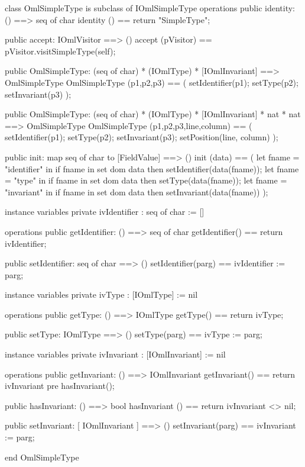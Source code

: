 \begin{vdm_al}
class OmlSimpleType is subclass of IOmlSimpleType
operations
  public identity: () ==> seq of char
  identity () == return "SimpleType";

  public accept: IOmlVisitor ==> ()
  accept (pVisitor) == pVisitor.visitSimpleType(self);

  public OmlSimpleType:
    (seq of char) *
    (IOmlType) *
    [IOmlInvariant] ==> OmlSimpleType
  OmlSimpleType (p1,p2,p3) == 
    ( setIdentifier(p1);
      setType(p2);
      setInvariant(p3) );

  public OmlSimpleType:
    (seq of char) *
    (IOmlType) *
    [IOmlInvariant] *
    nat *
    nat ==> OmlSimpleType
  OmlSimpleType (p1,p2,p3,line,column) == 
    ( setIdentifier(p1);
      setType(p2);
      setInvariant(p3);
      setPosition(line, column) );

  public init: map seq of char to [FieldValue] ==> ()
  init (data) ==
    ( let fname = "identifier" in
        if fname in set dom data
        then setIdentifier(data(fname));
      let fname = "type" in
        if fname in set dom data
        then setType(data(fname));
      let fname = "invariant" in
        if fname in set dom data
        then setInvariant(data(fname)) );

instance variables
  private ivIdentifier : seq of char := []

operations
  public getIdentifier: () ==> seq of char
  getIdentifier() == return ivIdentifier;

  public setIdentifier: seq of char ==> ()
  setIdentifier(parg) == ivIdentifier := parg;

instance variables
  private ivType : [IOmlType] := nil

operations
  public getType: () ==> IOmlType
  getType() == return ivType;

  public setType: IOmlType ==> ()
  setType(parg) == ivType := parg;

instance variables
  private ivInvariant : [IOmlInvariant] := nil

operations
  public getInvariant: () ==> IOmlInvariant
  getInvariant() == return ivInvariant
    pre hasInvariant();

  public hasInvariant: () ==> bool
  hasInvariant () == return ivInvariant <> nil;

  public setInvariant: [ IOmlInvariant ] ==> ()
  setInvariant(parg) == ivInvariant := parg;

end OmlSimpleType
\end{vdm_al}


